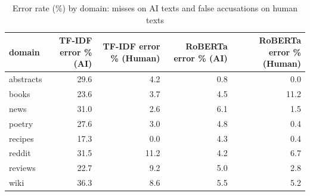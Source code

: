 \begin{table}[!t]
\centering
\caption{Error rate (\%) by domain: misses on AI texts and false accusations on human texts}
\label{tab:errors_by_domain}
\footnotesize
\begin{tabular}{lrrrr}
\toprule
\textbf{domain} & \textbf{TF-IDF error \% (AI)} & \textbf{TF-IDF error \% (Human)} & \textbf{RoBERTa error \% (AI)} & \textbf{RoBERTa error \% (Human)} \\
\midrule
abstracts & 29.6 & 4.2 & 0.8 & 0.0 \\
books & 23.6 & 3.7 & 4.5 & 11.2 \\
news & 31.0 & 2.6 & 6.1 & 1.5 \\
poetry & 27.6 & 3.0 & 4.8 & 0.4 \\
recipes & 17.3 & 0.0 & 4.3 & 0.4 \\
reddit & 31.5 & 11.2 & 4.2 & 6.7 \\
reviews & 22.7 & 9.2 & 5.0 & 2.8 \\
wiki & 36.3 & 8.6 & 5.5 & 5.2 \\
\bottomrule
\end{tabular}
\end{table}
